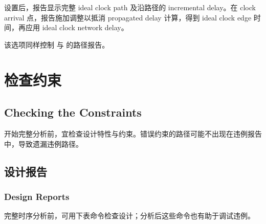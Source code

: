 设置后，报告显示完整 ideal clock path 及沿路径的 incremental delay。在 clock arrival 点，报告施加调整以抵消 propagated delay 计算，得到 ideal clock edge 时间，再应用 ideal clock network delay。

该选项同样控制  与  的路径报告。

\section{检查约束}
\subsection*{Checking the Constraints}

开始完整分析前，宜检查设计特性与约束。错误约束的路径可能不出现在违例报告中，导致遗漏违例路径。

\subsection{设计报告}
\subsubsection*{Design Reports}

完整时序分析前，可用下表命令检查设计；分析后这些命令也有助于调试违例。

